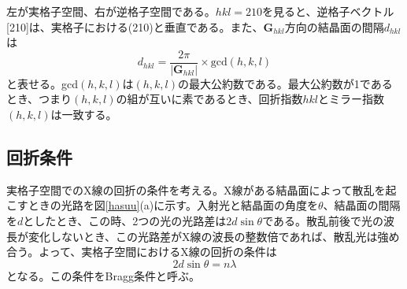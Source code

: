\documentclass[11pt,a4j,uplatex]{jsarticle}
\begin{document}
\newpage
左が実格子空間、右が逆格子空間である。$hkl=210$を見ると、逆格子ベクトル[210]は、実格子における(210)と垂直である。また、$\bm{G}_{hkl}$方向の結晶面の間隔$d_{hkl}$は
\begin{equation}
 d_{hkl}=\frac{2\pi}{|\bm{G}_{hkl}|}\times \mathrm{gcd}(h,k,l)
\end{equation}
と表せる。gcd$(h,k,l)$は$(h,k,l)$の最大公約数である。最大公約数が1であるとき、つまり$(h,k,l)$の組が互いに素であるとき、回折指数$hkl$とミラー指数$(h,k,l)$は一致する。



\newpage
\subsection{回折条件}
実格子空間でのX線の回折の条件を考える。X線がある結晶面によって散乱を起こすときの光路を図\ref{hasuu}(a)に示す。入射光と結晶面の角度を$\theta$、結晶面の間隔を$d$としたとき、この時、2つの光の光路差は$2d\sin\theta$である。散乱前後で光の波長が変化しないとき、この光路差がX線の波長の整数倍であれば、散乱光は強め合う。よって、実格子空間におけるX線の回折の条件は
\begin{equation}
 2d\sin\theta=n\lambda
 \label{bragg}
\end{equation}
となる。この条件をBragg条件と呼ぶ。
\end{document}

